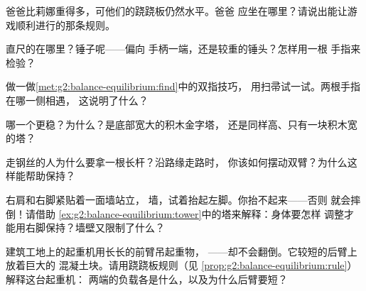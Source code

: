 \begin{exercise}[$\star$]\label{exo:g2:balance-equilibrium:4}
爸爸比莉娜重得多，可他们的跷跷板仍然水平。爸爸
应坐在哪里？请说出能让游戏顺利进行的那条规则。
\end{exercise}

\begin{exercise}[$\star$]\label{exo:g2:balance-equilibrium:5}
直尺的在哪里？锤子呢——偏向
手柄一端，还是较重的锤头？怎样用一根
手指来检验？
\end{exercise}

\begin{exercise}[$\star$]\label{exo:g2:balance-equilibrium:6}
做一做\cref{met:g2:balance-equilibrium:find}中的双指技巧，
用扫帚试一试。两根手指在哪一侧相遇，
这说明了什么？
\end{exercise}

\begin{exercise}[$\star$]\label{exo:g2:balance-equilibrium:7}
哪一个更稳？为什么？是底部宽大的积木金字塔，
还是同样高、只有一块积木宽的塔？
\end{exercise}

\begin{exercise}[$\star$]\label{exo:g2:balance-equilibrium:8}
走钢丝的人为什么要拿一根长杆？沿路缘走路时，
你该如何摆动双臂？为什么这样能帮助保持？
\end{exercise}

\begin{exercise}[$\star$]\label{exo:g2:balance-equilibrium:9}
右肩和右脚紧贴着一面墙站立，
墙，试着抬起左脚。你抬不起来——否则
就会摔倒！请借助
\cref{ex:g2:balance-equilibrium:tower}中的塔来解释：身体要怎样
调整才能用右脚保持？墙壁又限制了什么？
\end{exercise}

\begin{exercise}[$\star\star$]\label{exo:g2:balance-equilibrium:10}
建筑工地上的起重机用长长的前臂吊起重物，
——却不会翻倒。它较短的后臂上放着巨大的
混凝土块。请用跷跷板规则（见
\cref{prop:g2:balance-equilibrium:rule}）解释这台起重机：
两端的负载各是什么，以及为什么后臂要短？
\end{exercise}

